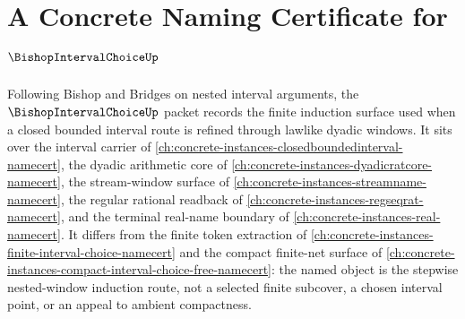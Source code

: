 \chapter{A Concrete Naming Certificate for $\BishopIntervalChoiceUp$}
\label{ch:concrete-instances-bishop-interval-choice-namecert}

Following Bishop and Bridges on nested interval arguments, the $\BishopIntervalChoiceUp$ packet records the finite induction surface used when a closed bounded interval route is refined through lawlike dyadic windows. It sits over the interval carrier of \autoref{ch:concrete-instances-closedboundedinterval-namecert}, the dyadic arithmetic core of \autoref{ch:concrete-instances-dyadicratcore-namecert}, the stream-window surface of \autoref{ch:concrete-instances-streamname-namecert}, the regular rational readback of \autoref{ch:concrete-instances-regseqrat-namecert}, and the terminal real-name boundary of \autoref{ch:concrete-instances-real-namecert}. It differs from the finite token extraction of \autoref{ch:concrete-instances-finite-interval-choice-namecert} and the compact finite-net surface of \autoref{ch:concrete-instances-compact-interval-choice-free-namecert}: the named object is the stepwise nested-window induction route, not a selected finite subcover, a chosen interval point, or an appeal to ambient compactness.

